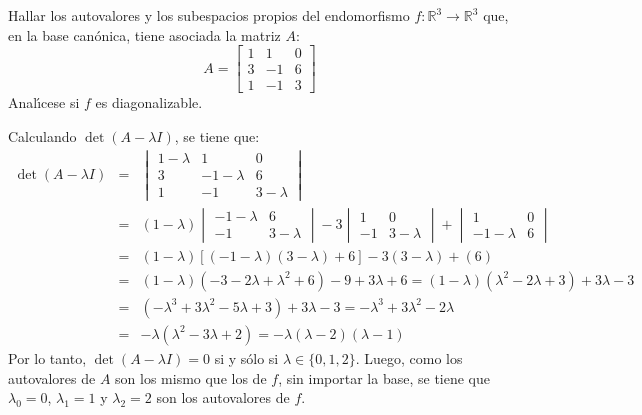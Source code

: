 \begin{enunciado}
 Hallar los autovalores y los subespacios propios del endomorfismo $f:\mathbb{R}^3 \rightarrow \mathbb{R}^3$ que, en la base can\'onica, tiene asociada la matriz $A$:
 \begin{equation*}
  A = 
  \begin{bmatrix}
   1 &  1 & 0 \\
   3 & -1 & 6 \\
   1 & -1 & 3
  \end{bmatrix}
 \end{equation*}
 Anal\'{\i}cese si $f$ es diagonalizable.
\end{enunciado}

\begin{solucion}
 Calculando $\det (A - \lambda I)$, se tiene que:
 \begin{eqnarray*}
  \det (A - \lambda I) & = & 
  \begin{vmatrix}
   1-\lambda &  1         & 0 \\
   3         & -1-\lambda & 6 \\
   1         & -1         & 3-\lambda
  \end{vmatrix} \\ 
  & = & (1-\lambda)
  \begin{vmatrix}
   -1-\lambda & 6         \\
   -1         & 3-\lambda
  \end{vmatrix}
  - 3
  \begin{vmatrix}
    1 & 0         \\
   -1 & 3-\lambda
  \end{vmatrix}
  + 
  \begin{vmatrix}
    1         & 0 \\
   -1-\lambda & 6
  \end{vmatrix} \\ 
  & = & (1-\lambda)\left[ (-1-\lambda)(3-\lambda) + 6 \right] - 3(3-\lambda) + (6) \\ 
  & = & (1-\lambda)(-3-2\lambda + \lambda^2 + 6) - 9 + 3\lambda + 6 = (1-\lambda)(\lambda^2 - 2\lambda + 3) + 3\lambda - 3 \\
  & = & (-\lambda^3 + 3\lambda^2 -5\lambda + 3) + 3\lambda - 3 = -\lambda^3 +3\lambda^2 -2\lambda \\
  & = & -\lambda(\lambda^2 - 3\lambda + 2) = -\lambda(\lambda - 2)(\lambda - 1) 
 \end{eqnarray*}
 Por lo tanto, $\det(A-\lambda I) = 0$ si y s\'olo si $\lambda \in \{ 0, 1, 2 \}$. Luego, como los autovalores de $A$ son los mismo que los de $f$, sin importar la base, se tiene que $\lambda_0 = 0$, $\lambda_1 = 1$ y $\lambda_2 = 2$ son los autovalores de $f$.

\end{solucion}
